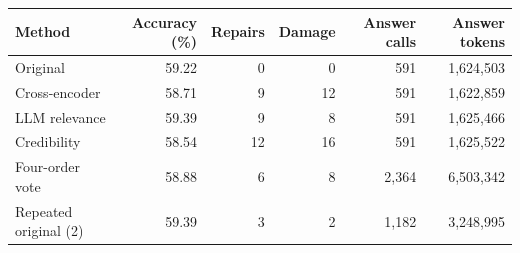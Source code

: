 \begin{tabular}{lrrrrr}
\toprule
Method & Accuracy (\%) & Repairs & Damage & Answer calls & Answer tokens \\
\midrule
Original & 59.22 & 0 & 0 & 591 & 1,624,503 \\
Cross-encoder & 58.71 & 9 & 12 & 591 & 1,622,859 \\
LLM relevance & 59.39 & 9 & 8 & 591 & 1,625,466 \\
Credibility & 58.54 & 12 & 16 & 591 & 1,625,522 \\
Four-order vote & 58.88 & 6 & 8 & 2,364 & 6,503,342 \\
Repeated original (2) & 59.39 & 3 & 2 & 1,182 & 3,248,995 \\
\bottomrule
\end{tabular}
